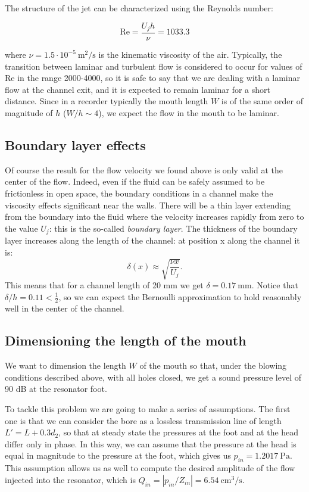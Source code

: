 \documentclass[a4paper]{article}
\begin{document}
The structure of the jet can be characterized using the Reynolds number:

$$ \mathrm{Re} = \frac{U_j h}{\nu} = 1033.3 $$

where $\nu = 1.5 \cdot 10^{-5}~ \si{\meter\squared\per\second}$ is the kinematic viscosity of the air. Typically, the transition between laminar and turbulent flow is considered to occur for values of Re in the range 2000-4000, so it is safe to say that we are dealing with a laminar flow at the channel exit, and it is expected to remain laminar for a short distance. Since in a recorder typically the mouth length $W$ is of the same order of magnitude of $h$ ($W/h \sim 4$), we expect the flow in the mouth to be laminar.

\subsection{Boundary layer effects}
Of course the result for the flow velocity we found above is only valid at the center of the flow. Indeed, even if the fluid can be safely assumed to be frictionless in open space, the boundary conditions in a channel make the viscosity effects significant near the walls. There will be a thin layer extending from the boundary into the fluid where the velocity increases rapidly from zero to the value $U_j$: this is the so-called \emph{boundary layer}. The thickness of the boundary layer increases along the length of the channel: at position x along the channel it is:
$$ \delta(x) \approx \sqrt{\frac{\nu x}{U_j}}. $$
This means that for a channel length of 20 mm we get $\delta = \SI{0.17}{\milli\meter}$. Notice that $\delta/h = 0.11 < \frac{1}{2}$, so we can expect the Bernoulli approximation to hold reasonably well in the center of the channel.

\subsection{Dimensioning the length of the mouth}
We want to dimension the length $W$ of the mouth so that, under the blowing conditions described above, with all holes closed, we get a sound pressure level of 90 dB at the resonator foot.

To tackle this problem we are going to make a series of assumptions. The first one is that we can consider the bore as a lossless transmission line of length $L' = L + 0.3d_2$, so that at steady state the pressures at the foot and at the head differ only in phase. In this way, we can assume that the pressure at the head is equal in magnitude to the pressure at the foot, which gives us $p_{in} = 1.2017~\si{\pascal}$. This assumption allows us as well to compute the desired amplitude of the flow injected into the resonator, which is $Q_{in} = \left|p_{in}/Z_{in}\right| = \SI{6.54}{\centi\meter\cubed\per\second}$.
\end{document}
